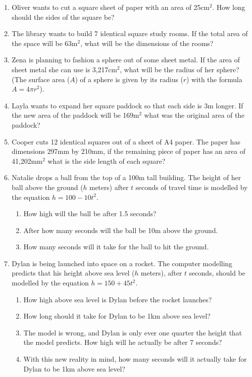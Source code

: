 \documentclass[a4paper,12pt]{article}
\begin{document}
\begin{enumerate}
\item Oliver wants to cut a square sheet of paper with an 
area of 25cm$^2$. How long should the sides of the square be?

\item The library wants to build 7 identical square study rooms. 
If the total area of the space will be 63m$^2$, what will be 
the dimensions of the rooms?

\item Zena is planning to fashion a sphere out of some sheet
metal. If the area of sheet metal she can use is 3,217cm$^2$, 
what will be the radius of her sphere? (The surface area ($A$) of 
a sphere is given by its radius ($r$) with the 
formula $A = 4\pi r^2$).

\item Layla wants to expand her square paddock so that each 
side is 3m longer. If the new area of the paddock will be 169m$^2$ 
what was the original area of the paddock?

\item Cooper cuts 12 identical squares out of a sheet of A4 paper. 
The paper has dimensions 297mm by 210mm, if the remaining piece 
of paper has an area of 41,202mm$^2$ what is the side length of
each square?

\item Natalie drops a ball from the top of a 100m tall building. 
The height of her ball above the ground ($h$ meters) after $t$ 
seconds of travel time is modelled by the equation 
$h = 100 - 10t^2$.

\begin{enumerate}
    \item How high will the ball be after 1.5 seconds?
    \item After how many seconds will the ball be 10m above
    the ground.
    \item How many seconds will it take for the ball to hit the 
    ground.
\end{enumerate}

\item Dylan is being launched into space on a rocket. The 
computer modelling predicts that his height above sea level 
($h$ meters), after $t$ seconds, should be modelled 
by the equation $h = 150 + 45t^2$.

\begin{enumerate}
    \item How high above sea level is Dylan before the rocket 
    launches?
    \item How long should it take for Dylan to be 1km above 
    sea level?
    \item The model is wrong, and Dylan is
    only ever one quarter the height that the model predicts.
    How high will he actually be after 7 seconds?
    \item With this new reality in mind, how many seconds will 
    it actually take for Dylan to be 1km above sea level?
\end{enumerate}


\end{enumerate}
\end{document}
